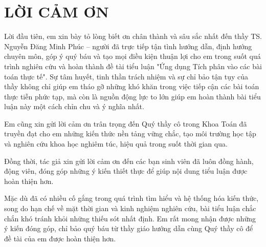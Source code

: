\documentclass[12pt,a4paper,oneside]{book}
\theoremstyle{theorem}
\theoremstyle{definition}
\begin{document}
	
	
	\newpage
	\newpage
	\def\@chapter[#1]#2{\ifnum \c@secnumdepth >\m@ne
		\if@mainmatter
		\refstepcounter{chapter}%
		\typeout{\@chapapp\space\thechapter.}%
		\addcontentsline{toc}{chapter}%
		{\bf  Chương \protect\numberline{\thechapter. } #1}%
		\else
		\addcontentsline{toc}{chapter}{ #1}%
		\fi
		\else
		\addcontentsline{toc}{chapter}{ #1}%
		\fi
		\chaptermark{#1}%
		\addtocontents{lof}{\protect\addvspace{10\p@}}%
		\addtocontents{lot}{\protect\addvspace{10\p@}}%
		\if@twocolumn
		\@topnewpage[\@makechapterhead{#2}]%
		\else
		\@makechapterhead{#2}%
		\@afterheading
		\fi}
	\tableofcontents
	\pagestyle{plain}
	\chapter*{LỜI CẢM ƠN}
	\fontsize{13pt}{22pt} \selectfont
Lời đầu tiên, em xin bày tỏ lòng biết ơn chân thành và sâu sắc nhất đến thầy TS. Nguyễn Đăng Minh Phúc – người đã trực tiếp tận tình hướng dẫn, định hướng chuyên môn, góp ý quý báu và tạo mọi điều kiện thuận lợi cho em trong suốt quá trình nghiên cứu và hoàn thành đề tài tiểu luận "Ứng dụng Tích phân vào các bài toán thực tế". Sự tâm huyết, tinh thần trách nhiệm và sự chỉ bảo tận tụy của thầy không chỉ giúp em tháo gỡ những khó khăn trong việc tiếp cận các bài toán thực tiễn phức tạp, mà còn là nguồn động lực to lớn giúp em hoàn thành bài tiểu luận này một cách chỉn chu và ý nghĩa nhất.

Em cũng xin gửi lời cảm ơn trân trọng đến Quý thầy cô trong Khoa Toán đã truyền đạt cho em những kiến thức nền tảng vững chắc, tạo môi trường học tập và nghiên cứu khoa học nghiêm túc, hiệu quả trong suốt thời gian qua.

Đồng thời, tác giả xin gửi lời cảm ơn đến các bạn sinh viên đã luôn đồng hành, động viên, đóng góp những ý kiến thiết thực để giúp nội dung tiểu luận được hoàn thiện hơn.

Mặc dù đã có nhiều cố gắng trong quá trình tìm hiểu và hệ thống hóa kiến thức, song do hạn chế về mặt thời gian và kinh nghiệm nghiên cứu, bài tiểu luận chắc chắn khó tránh khỏi những thiếu sót nhất định. Em rất mong nhận được những ý kiến đóng góp, chỉ bảo quý báu từ thầy giáo hướng dẫn cùng Quý thầy cô để đề tài của em được hoàn thiện hơn.
\end{document}
